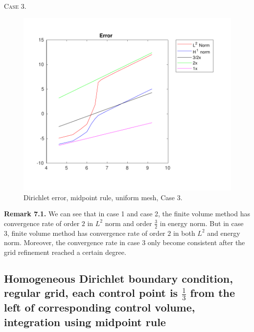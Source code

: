 \documentclass[a4paper]{article}
\numberwithin{equation}{section}
\begin{document}
\newpage
\noindent
\textsc{Case 3.}
\begin{figure}[H]
\centering\includegraphics[width=13.5cm]{fig_dirichlet_error_midpoint_cp_uniform_midpoint_C3_M100}
\caption{Dirichlet error, midpoint rule, uniform mesh, Case 3.}
\end{figure}
\noindent\textbf{Remark 7.1.} We can see that in case 1 and case 2, the finite volume method has convergence rate of order $2$ in $L^2$ norm and order $\frac{3}{2}$ in energy norm. But in case 3, finite volume method has convergence rate of order $2$ in both $L^2$ and energy norm. Moreover, the convergence rate in case 3 only become consistent after the grid refinement reached a certain degree.
\newpage
\subsection{Homogeneous Dirichlet boundary condition, regular grid, each control point is $\frac{1}{3}$ from the left of corresponding control volume, integration using midpoint rule}
\end{document}
